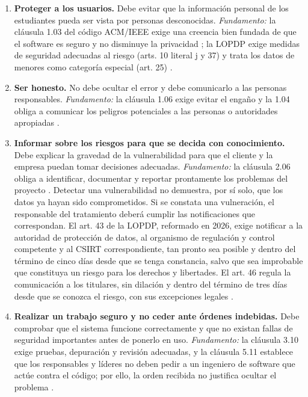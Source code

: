 \documentclass[12pt,a4paper,oneside]{article}
\newcommand{\cita}[1]{\cite{#1}}
\newcommand{\citaa}[2]{\cite{#1,#2}}
\begin{document}
\begin{enumerate}[leftmargin=1.8em,itemsep=4pt]
    \item \textbf{Proteger a los usuarios.} Debe evitar que la información personal de los estudiantes pueda ser vista por personas desconocidas. \emph{Fundamento:} la cláusula 1.03 del código ACM/IEEE exige una creencia bien fundada de que el software es seguro y no disminuye la privacidad \cita{ref:acm}; la LOPDP exige medidas de seguridad adecuadas al riesgo (arts. 10 literal j y 37) y trata los datos de menores como categoría especial (art. 25) \cita{ref:lopdp}.
    \item \textbf{Ser honesto.} No debe ocultar el error y debe comunicarlo a las personas responsables. \emph{Fundamento:} la cláusula 1.06 exige evitar el engaño y la 1.04 obliga a comunicar los peligros potenciales a las personas o autoridades apropiadas \cita{ref:acm}.
    \item \textbf{Informar sobre los riesgos para que se decida con conocimiento.} Debe explicar la gravedad de la vulnerabilidad para que el cliente y la empresa puedan tomar decisiones adecuadas. \emph{Fundamento:} la cláusula 2.06 obliga a identificar, documentar y reportar prontamente los problemas del proyecto \cita{ref:acm}. Detectar una vulnerabilidad no demuestra, por sí solo, que los datos ya hayan sido comprometidos. Si se constata una vulneración, el responsable del tratamiento deberá cumplir las notificaciones que correspondan. El art. 43 de la LOPDP, reformado en 2026, exige notificar a la autoridad de protección de datos, al organismo de regulación y control competente y al CSIRT correspondiente, tan pronto sea posible y dentro del término de cinco días desde que se tenga constancia, salvo que sea improbable que constituya un riesgo para los derechos y libertades. El art. 46 regula la comunicación a los titulares, sin dilación y dentro del término de tres días desde que se conozca el riesgo, con sus excepciones legales \citaa{ref:lopdp}{ref:ciber}.
    \item \textbf{Realizar un trabajo seguro y no ceder ante órdenes indebidas.} Debe comprobar que el sistema funcione correctamente y que no existan fallas de seguridad importantes antes de ponerlo en uso. \emph{Fundamento:} la cláusula 3.10 exige pruebas, depuración y revisión adecuadas, y la cláusula 5.11 establece que los responsables y líderes no deben pedir a un ingeniero de software que actúe contra el código; por ello, la orden recibida no justifica ocultar el problema \cita{ref:acm}.
\end{enumerate}
\end{document}
